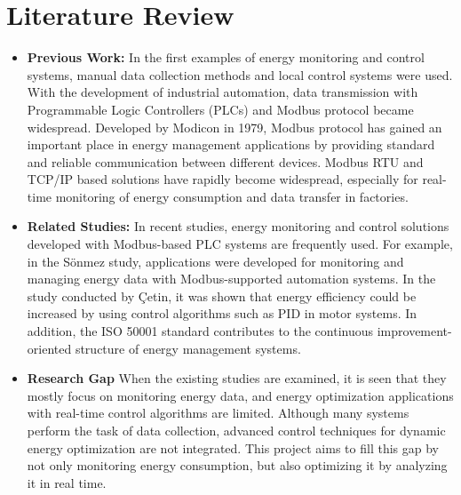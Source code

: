 \section{Literature Review}
\begin{itemize}
\item \textbf{Previous Work:}
In the first examples of energy monitoring and control systems, manual data collection methods and local control systems were used. With the development of industrial automation, data transmission with Programmable Logic Controllers (PLCs) and Modbus protocol became widespread. Developed by Modicon in 1979, Modbus protocol has gained an important place in energy management applications by providing standard and reliable communication between different devices. Modbus RTU and TCP/IP based solutions have rapidly become widespread, especially for real-time monitoring of energy consumption and data transfer in factories.
\item \textbf{Related Studies:}
In recent studies, energy monitoring and control solutions developed with Modbus-based PLC systems are frequently used. For example, in the Sönmez study, applications were developed for monitoring and managing energy data with Modbus-supported automation systems. In the study conducted by Çetin, it was shown that energy efficiency could be increased by using control algorithms such as PID in motor systems. In addition, the ISO 50001 standard contributes to the continuous improvement-oriented structure of energy management systems.
\item \textbf{Research Gap}
When the existing studies are examined, it is seen that they mostly focus on monitoring energy data, and energy optimization applications with real-time control algorithms are limited. Although many systems perform the task of data collection, advanced control techniques for dynamic energy optimization are not integrated. This project aims to fill this gap by not only monitoring energy consumption, but also optimizing it by analyzing it in real time.
\end{itemize}

